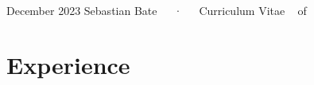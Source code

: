 \documentclass[11pt,a4paper,]{awesome-cv}
\begin{document}
\makecvheader

\makecvfooter
  {December 2023}
    {Sebastian Bate~~~·~~~Curriculum Vitae}
  {\thepage~ of \pageref{LastPage}~}





\hypertarget{experience}{%
\section{Experience}\label{experience}}
\end{document}
